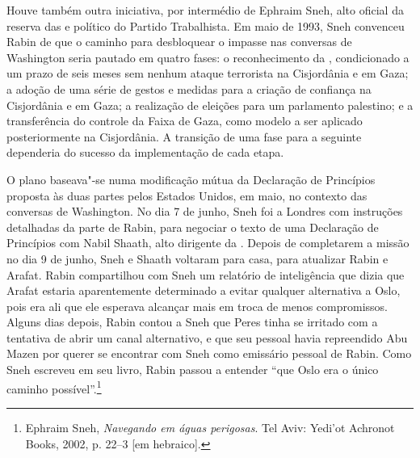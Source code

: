 Houve também outra iniciativa, por intermédio de Ephraim Sneh, alto
oficial da reserva das  e político do Partido Trabalhista. Em maio de
1993, Sneh convenceu Rabin de que o caminho para desbloquear o impasse
nas conversas de Washington seria pautado em quatro fases: o
reconhecimento da , condicionado a um prazo de seis meses sem nenhum
ataque terrorista na Cisjordânia e em Gaza; a adoção de uma série de
gestos e medidas para a criação de confiança na Cisjordânia e em Gaza; a
realização de eleições para um parlamento palestino; e a transferência
do controle da Faixa de Gaza, como modelo a ser aplicado posteriormente
na Cisjordânia. A transição de uma fase para a seguinte dependeria
do sucesso da implementação de cada etapa.

O plano baseava"-se numa modificação mútua da Declaração de Princípios
proposta às duas partes pelos Estados Unidos, em maio, no contexto das
conversas de Washington. No dia 7 de junho, Sneh foi a Londres com
instruções detalhadas da parte de Rabin, para negociar o texto de uma
Declaração de Princípios com Nabil Shaath, alto dirigente da . Depois
de completarem a missão no dia 9 de junho, Sneh e Shaath voltaram para
casa, para atualizar Rabin e Arafat. Rabin compartilhou com Sneh um
relatório de inteligência que dizia que Arafat estaria aparentemente
determinado a evitar qualquer alternativa a Oslo, pois era ali que ele
esperava alcançar mais em troca de menos compromissos. Alguns dias
depois, Rabin contou a Sneh que Peres tinha se irritado com a
tentativa de abrir um canal alternativo, e que seu pessoal havia
repreendido Abu Mazen por querer se encontrar com Sneh como emissário
pessoal de Rabin. Como Sneh escreveu em seu livro, Rabin passou a
entender ``que Oslo era o único caminho possível''.\footnote{Ephraim
  Sneh, \emph{Navegando em águas perigosas}. Tel Aviv: Yedi'ot Achronot Books, 2002, p. 22--3
  {[}em hebraico{]}.}

